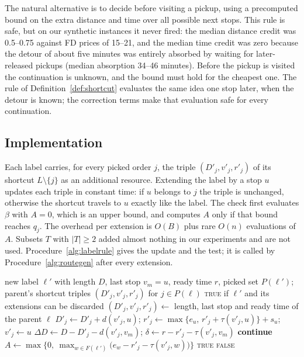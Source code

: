 \documentclass[review,12pt]{elsarticle}
\theoremstyle{definition}
\theoremstyle{remark}
\newcommand{\lth}{\underline{\theta}}
\begin{document}
The natural alternative is to decide before visiting a pickup, using a
precomputed bound on the extra distance and time over all possible next
stops. This rule is safe, but on our synthetic instances it never fired: the
median distance credit was 0.5--0.75 against FD prices of 15--21, and the
median time credit was zero because the detour of about five minutes was
entirely absorbed by waiting for later-released pickups (median absorption
34--46 minutes). Before the pickup is visited the continuation is unknown,
and the bound must hold for the cheapest one. The rule of
Definition~\ref{def:shortcut} evaluates the same idea one stop later, when
the detour is known; the correction terms make that evaluation safe for
every continuation.

\subsection{Implementation}

Each label carries, for every picked order $j$, the triple $(D'_j,v'_j,r'_j)$
of its shortcut $L\setminus\{j\}$ as an additional resource. Extending the
label by a stop $u$ updates each triple in constant time: if $u$ belongs to
$j$ the triple is unchanged, otherwise the shortcut travels to $u$ exactly
like the label. The check first evaluates $\beta$ with $A=0$, which is an
upper bound, and computes $A$ only if that bound reaches $q_j$. The overhead
per extension is $O(B)$ plus rare $O(n)$ evaluations of $A$. Subsets $T$ with
$|T|\ge2$ added almost nothing in our experiments and are not used.
Procedure~\ref{alg:labelrule} gives the update and the test; it is called by
Procedure~\ref{alg:routegen} after every extension.

\begin{algorithm}[!htbp]
\caption{\textsc{RuleFires}$(\ell')$: FD-completion test after extending $\ell$ by stop $u$}
\label{alg:labelrule}
\begin{algorithmic}[1]
\Require new label $\ell'$ with length $D$, last stop $v_m=u$, ready time $r$, picked set $P(\ell')$; parent's shortcut triples $(D'_j,v'_j,r'_j)$ for $j\in P(\ell)$
\Ensure \textsc{true} if $\ell'$ and its extensions can be discarded
 
   \State $(D'_j,v'_j,r'_j)\gets$ length, last stop and ready time of the parent $\ell$
    \State $D'_j\gets D'_j+d(v'_j,u)$; \quad $r'_j\gets\max\{e_u,\,r'_j+\tau(v'_j,u)\}+s_u$; \quad $v'_j\gets u$
  \EndIf {}
\EndFor
{} 
  \State $\Delta D\gets D-D'_j-d(v'_j,v_m)$; \quad $\delta\gets r-r'_j-\tau(v'_j,v_m)$
  \If{$\kappa\,\Delta D+\lth\max\{0,\delta\}/60<q_j$} \textbf{continue} 
  \EndIf
  \State $A\gets\max\bigl\{0,\ \max_{w\in F(\ell')}\bigl(e_w-r'_j-\tau(v'_j,w)\bigr)\bigr\}$ 
  \If{$\kappa\,\Delta D+\lth\max\{0,\delta-A\}/60\ge q_j$} \Return \textsc{true} \EndIf
\EndFor
\State \Return \textsc{false}
\end{algorithmic}
\end{algorithm}
\end{document}
